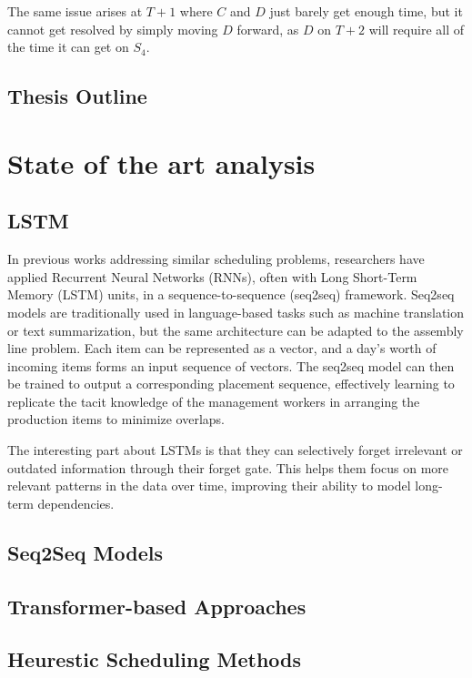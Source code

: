 \documentclass[12pt,a4paper]{report}
\begin{document}
The same issue arises at $T+1$ where $C$ and $D$ just barely get enough time, but it cannot get resolved by simply moving $D$ forward, as $D$ on $T+2$ will require all of the time it can get on $S_4$. 

\section{Thesis Outline}

\chapter{State of the art analysis}
\section{LSTM}

In previous works addressing similar scheduling problems, researchers have applied Recurrent Neural Networks (RNNs), often with Long Short-Term Memory (LSTM) units, in a sequence-to-sequence (seq2seq) framework. Seq2seq models are traditionally used in language-based tasks such as machine translation or text summarization, but the same architecture can be adapted to the assembly line problem.\cite{ref2} Each item can be represented as a vector, and a day’s worth of incoming items forms an input sequence of vectors. The seq2seq model can then be trained to output a corresponding placement sequence, effectively learning to replicate the tacit knowledge of the management workers in arranging the production items to minimize overlaps.\cite{ref3} 

The interesting part about LSTMs is that they can selectively forget irrelevant or outdated information through their forget gate. This helps them focus on more relevant patterns in the data over time, improving their ability to model long-term dependencies. \cite{ref4}

\section{Seq2Seq Models}
\section{Transformer-based Approaches}
\section{Heurestic Scheduling Methods}
\end{document}

